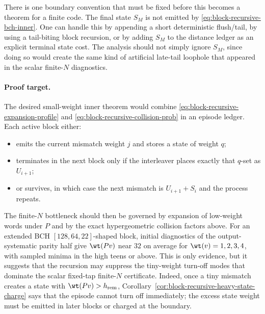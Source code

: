 There is one boundary convention that must be fixed before this becomes a theorem for a finite code.  The final state
\(S_M\) is not emitted by \eqref{eq:block-recursive-bch-inner}.  One can handle this by appending a short deterministic
flush/tail, by using a tail-biting block recursion, or by adding \(S_M\) to the distance ledger as an explicit terminal
state cost.  The analysis should not simply ignore \(S_M\), since doing so would create the same kind of artificial
late-tail loophole that appeared in the scalar finite-\(N\) diagnostics.

\paragraph{Proof target.}
The desired small-weight inner theorem would combine \eqref{eq:block-recursive-expansion-profile} and
\eqref{eq:block-recursive-collision-prob} in an episode ledger.  Each active block either:
\begin{itemize}
\item emits the current mismatch weight \(j\) and stores a state of weight \(q\);
\item terminates in the next block only if the interleaver places exactly that \(q\)-set as \(U_{i+1}\);
\item or survives, in which case the next mismatch is \(U_{i+1}+S_i\) and the process repeats.
\end{itemize}
The finite-\(N\) bottleneck should then be governed by expansion of low-weight words under \(P\) and by the exact
hypergeometric collision factors above.  For an extended BCH \([128,64,22]\)-shaped block, initial diagnostics of the
output-systematic parity half give \(\wt(Pv)\) near \(32\) on average for \(\wt(v)=1,2,3,4\), with sampled minima in
the high teens or above.  This is only evidence, but it suggests that the recursion may suppress the tiny-weight
turn-off modes that dominate the scalar fixed-tap finite-\(N\) certificate.  Indeed, once a tiny mismatch creates a
state with \(\wt(Pv)>h_{\rm rem}\), Corollary~\ref{cor:block-recursive-heavy-state-charge} says that the episode cannot
turn off immediately; the excess state weight must be emitted in later blocks or charged at the boundary.

